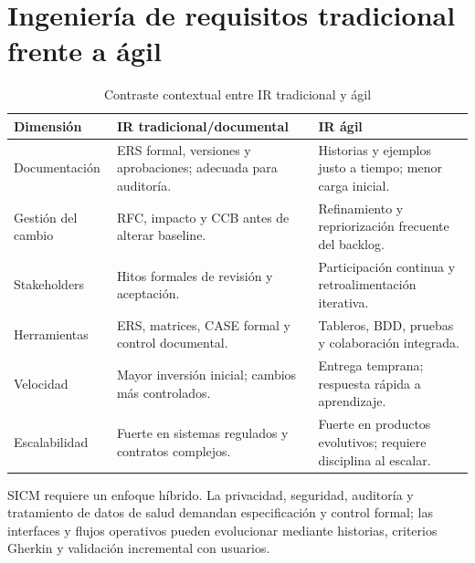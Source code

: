 \documentclass[11pt,a4paper]{article}
\begin{document}
	\section{Ingeniería de requisitos tradicional frente a ágil}
	\begin{table}[H]
		\centering
		\caption{Contraste contextual entre IR tradicional y ágil}
		\begin{tabularx}{\textwidth}{p{2.7cm}X X}
			\toprule
			\textbf{Dimensión} & \textbf{IR tradicional/documental} & \textbf{IR ágil}\\
			\midrule
			Documentación & ERS formal, versiones y aprobaciones; adecuada para auditoría. & Historias y ejemplos justo a tiempo; menor carga inicial.\\
			Gestión del cambio & RFC, impacto y CCB antes de alterar baseline. & Refinamiento y repriorización frecuente del backlog.\\
			Stakeholders & Hitos formales de revisión y aceptación. & Participación continua y retroalimentación iterativa.\\
			Herramientas & ERS, matrices, CASE formal y control documental. & Tableros, BDD, pruebas y colaboración integrada.\\
			Velocidad & Mayor inversión inicial; cambios más controlados. & Entrega temprana; respuesta rápida a aprendizaje.\\
			Escalabilidad & Fuerte en sistemas regulados y contratos complejos. & Fuerte en productos evolutivos; requiere disciplina al escalar.\\
			\bottomrule
		\end{tabularx}
	\end{table}
	
	SICM requiere un enfoque híbrido. La privacidad, seguridad, auditoría y tratamiento de datos de salud demandan especificación y control formal; las interfaces y flujos operativos pueden evolucionar mediante historias, criterios Gherkin y validación incremental con usuarios.
	
\end{document}
